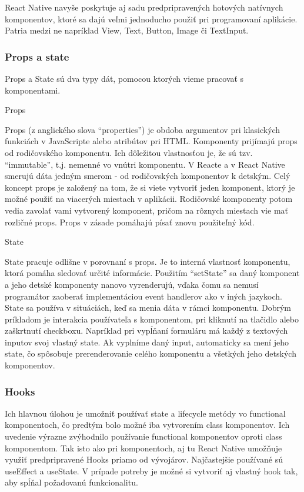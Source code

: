 React Native navyše poskytuje aj sadu predpripravených hotových natívnych komponentov, ktoré sa dajú veľmi jednoducho použiť pri programovaní aplikácie. Patria medzi ne napríklad View, Text, Button, Image či TextInput. \\

\subsubsection{Props a state}
Props a State sú dva typy dát, pomocou ktorých vieme pracovať s komponentami.
\begin{itemize}[leftmargin=*]
{\bf \item Props} \newline
Props (z anglického slova ``properties'') je obdoba argumentov pri klasických funkciách v JavaScripte alebo atribútov pri HTML. Komponenty prijímajú props od rodičovského komponentu. Ich dôležitou vlastnosťou je, že sú tzv. ``immutable'', t.j. nemenné vo vnútri komponentu. V Reacte a v React Native smerujú dáta jedným smerom - od rodičovských komponentov k detským. Celý koncept props je založený na tom, že si viete vytvoriť jeden komponent, ktorý je možné použiť na viacerých miestach v aplikácii. Rodičovské komponenty potom vedia zavolať vami vytvorený komponent, pričom na rôznych miestach vie mať rozličné props. Props v zásade pomáhajú písať znovu použiteľný kód. \cite{props}
{\bf \item State} \newline
State pracuje odlišne v porovnaní s props. Je to interná vlastnosť komponentu, ktorá pomáha sledovať určité informácie. Použitím ``setState'' sa daný komponent a jeho detské komponenty nanovo vyrenderujú, vďaka čomu sa nemusí programátor zaoberať implementáciou event handlerov ako v iných jazykoch. State sa používa v situáciách, keď sa menia dáta v rámci komponentu. Dobrým príkladom je interakcia používateľa s komponentom, pri kliknutí na tlačidlo alebo zaškrtnutí checkboxu. Napríklad pri vypĺňaní formuláru má každý z textových inputov svoj vlastný state. Ak vyplníme daný input, automaticky sa mení jeho state, čo spôsobuje prerenderovanie celého komponentu a všetkých jeho detských komponentov. \cite{props} \\
\end{itemize} 
\subsubsection{Hooks}
Ich hlavnou úlohou je umožniť používať state a lifecycle metódy vo functional komponentoch, čo predtým bolo možné iba vytvorením class komponentov. Ich uvedenie výrazne zvýhodnilo používanie functional komponentov oproti class komponentom. Tak isto ako pri komponentoch, aj tu React Native umožňuje využiť predpripravené Hooks priamo od vývojárov. Najčastejšie používané sú useEffect a useState. V prípade potreby je možné si vytvoriť aj vlastný hook tak, aby spĺňal požadovanú funkcionalitu. \cite{hooks} \\
